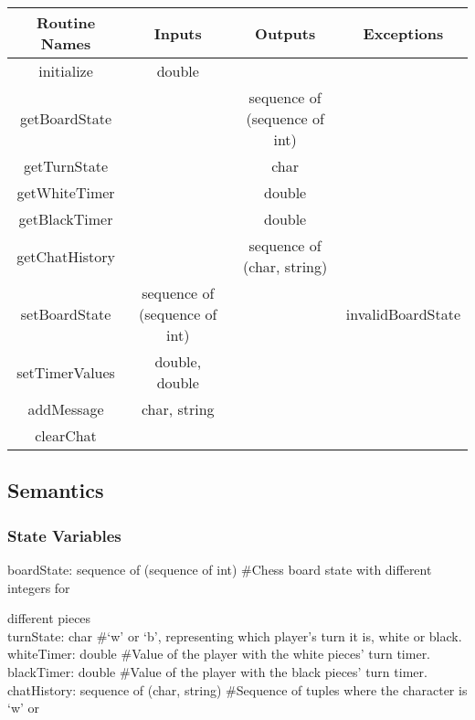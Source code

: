 \documentclass[12pt, titlepage]{article}
\begin{document}
        \begin{center}
            \begin{tabular}{|c|c|c|c|} 
                \hline
                Routine Names & Inputs & Outputs & Exceptions \\
                \hline
                initialize & double & & \\
                \hline
                getBoardState & & sequence of (sequence of int) & \\ 
                \hline
                getTurnState & & char & \\
                \hline
                getWhiteTimer & & double & \\ 
                \hline
                getBlackTimer & & double & \\ 
                \hline
                getChatHistory & & sequence of (char, string) & \\ 
                \hline
                setBoardState & sequence of (sequence of int) & & invalidBoardState\\ 
                \hline
                setTimerValues & double, double & & \\ 
                \hline
                addMessage & char, string & & \\ 
                \hline
                clearChat & & & \\
                \hline
            \end{tabular}
        \end{center}
    
    \subsection*{Semantics}
        \subsubsection*{State Variables}
            boardState: sequence of (sequence of int) \#Chess board state with different integers for 
            
            different pieces\\
            turnState: char \#`w' or `b', representing which player's turn it is, white or black. \\
            whiteTimer: double \#Value of the player with the white pieces' turn timer. \\
            blackTimer: double \#Value of the player with the black pieces' turn timer. \\
            chatHistory: sequence of (char, string) \#Sequence of tuples where the character is `w' or 
            
\end{document}
